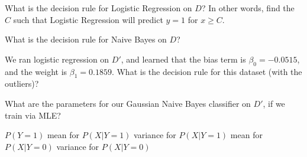 \documentclass[11pt,addpoints,answers]{exam}
\begin{document}
\begin{questions}
\begin{parts}
\begin{subparts}
\subpart[1] What is the decision rule for Logistic Regression on $D$? In other words, find the $C$ such that Logistic Regression will predict $y=1$ for $x \ge C$.

\begin{your_solution}[width = 4cm,height=2cm]
\end{your_solution}


\subpart[1] What is the decision rule for Naive Bayes on $D$? 

\begin{your_solution}[width = 4cm,height=2cm]
\end{your_solution}


\subpart[1] We ran logistic regression on $D'$, and learned that the bias term is $\beta_0 = -0.0515$, and the weight is $\beta_1 = 0.1859$. What is the decision rule for this dataset (with the outliers)?

\begin{your_solution}[width = 4cm,height=2cm]
\end{your_solution}

\newpage

\subpart[5] What are the parameters for our Gaussian Naive Bayes classifier on $D'$, if we train via MLE? 

\begin{subparts}
    \subpart $P(Y=1)$
    \subpart mean for $P(X|Y=1)$
    \subpart variance for $P(X|Y=1)$
    \subpart mean for $P(X|Y=0)$
    \subpart variance for $P(X|Y=0)$
\end{subparts}

\begin{your_solution}[width=4cm,height=2cm, title = (a)]
\end{your_solution}
\begin{your_solution}[width=4cm,height=2cm, title = (b)]
\end{your_solution}
\begin{your_solution}[width=4cm,height=2cm, title = (c)]
\end{your_solution}
\begin{your_solution}[width=4cm,height=2cm, title = (d)]
\end{your_solution}
\begin{your_solution}[width=4cm,height=2cm, title = (e)]
\end{your_solution}



\end{subparts}
\end{parts}
\end{questions}
\end{document}
